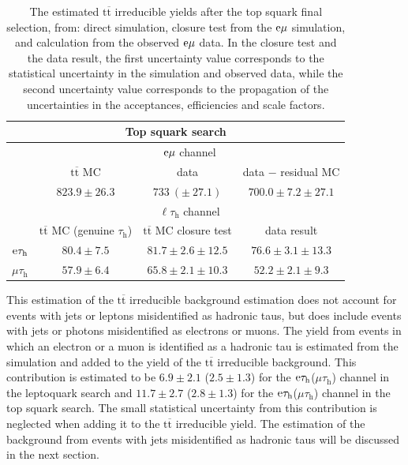\documentclass[12pt]{thesis}  %
\newcommand{\tauh}{\ensuremath{\tau_{\text{h}}}\xspace}
\newcommand{\Pe}{\ensuremath{\cmsSymbolFace{e}}\xspace}
\newcommand{\mutau}{\ensuremath{\mu\tauh}\xspace}
\newcommand{\etau}{\ensuremath{\Pe\tauh}\xspace}
\newcommand{\emu}{\ensuremath{\Pe\mu}\xspace}
\newcommand{\ltau}{\ensuremath{\ell\tauh}\xspace}
\renewcommand{\ttbar}{\ensuremath{\mathrm{t}\overline{\mathrm{t}}}\xspace}
\begin{document}
\begin{table}[hbt]
  \begin{center}
    \begin{tabular}{|l|c|c|c|}
      \multicolumn{4}{c}{Top squark search} \\
      \hline
      \multirow{3}{*}{} & \multicolumn{3}{c|}{$\emu$ channel} \\
      \cline{2-4}
      & \ttbar MC & data & data $-$ residual MC \\
      \cline{2-4}
      & $823.9 \pm 26.3$ & $733~(\pm~27.1)$ & $700.0 \pm 7.2 \pm 27.1$ \\
      \hline\hline
      \multirow{2}{*}{} & \multicolumn{3}{c|}{$\ltau$ channel} \\
      \hline
      channel & \ttbar MC (genuine \tauh) & \ttbar MC closure test & data result \\
      \hline
      $\etau$         & $80.4\pm7.5$ & $81.7\pm2.6\pm12.5$ & $76.6\pm3.1\pm13.3$ \\
      $\mutau$       & $57.9\pm6.4$ & $65.8\pm2.1\pm10.3$ & $52.2\pm2.1\pm9.3$ \\
      \hline
    \end{tabular}
    \caption{The estimated \ttbar irreducible yields after the top squark final selection, from: direct simulation, closure test from the $\emu$ simulation, and calculation from the observed $\emu$ data. In the closure test and the data result, the first uncertainty value corresponds to the statistical uncertainty in the simulation and observed data, while the second uncertainty value corresponds to the propagation of the uncertainties in the acceptances, efficiencies and scale factors. }
    \label{tab:ttYieldsLQD}
  \end{center}
\end{table}

This estimation of the \ttbar irreducible background estimation does not account for events with jets or leptons misidentified as hadronic taus, but does include events with jets or photons misidentified as electrons or muons. The yield from events in which an electron or a muon is identified as a hadronic tau is estimated from the simulation and added to the yield of the \ttbar irreducible background. This contribution is estimated to be $6.9\pm 2.1$ ($2.5\pm 1.3$) for the \etau (\mutau) channel in the leptoquark search and $11.7\pm 2.7$ ($2.8 \pm 1.3$) for the \etau (\mutau) channel in the top squark search. The small statistical uncertainty from this contribution is neglected when adding it to the \ttbar irreducible yield. The estimation of the background from events with jets misidentified as hadronic taus will be discussed in the next section.
\end{document}
